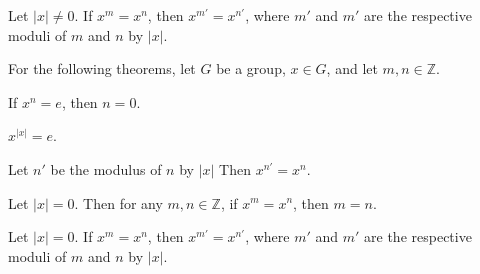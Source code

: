 \begin{theorem}
    \label{theorem : mod_order_eq_of_mpow_eq}
    \leanok
    Let $|x| \ne 0$. If $x^m = x^n$, then $x^{m'} = x^{n'}$, where $m'$ and $m'$ are the respective moduli of $m$ and $n$ by $|x|$.
\end{theorem}

For the following theorems, let $G$ be a group, $x \in G$, and let $m,n \in \mathbb{Z}$.

\begin{theorem}
    \label{theorem : gpow_order}
    \leanok
    If $x^n = e$, then $n = 0$.
\end{theorem}

\begin{theorem}
    \label{theorem : gpow_order_zero}
    \leanok
    $x^{|x|} = e$.
\end{theorem}

\begin{theorem}
    \label{theorem : gpow_mod_order}
    Let $n'$ be the modulus of $n$ by $|x|$ Then $x^{n'} = x^n$.
\end{theorem}

\begin{theorem}
    \label{theorem : gpow_inj_of_order_zero}
    Let $|x| = 0$. Then for any $m,n \in \mathbb{Z}$, if $x^m = x^n$, then $m = n$.
\end{theorem}

\begin{theorem}
    \label{theorem : mod_order_eq_of_gpow_eq}
    Let $|x| = 0$. If $x^m = x^n$, then $x^{m'} = x^{n'}$, where $m'$ and $m'$ are the respective moduli of $m$ and $n$ by $|x|$.
\end{theorem}
